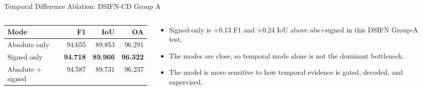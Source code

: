 \begin{frame}{Temporal Difference Ablation: DSIFN-CD Group A}
    \begin{columns}[T,onlytextwidth]
        \begin{column}{0.46\textwidth}
            \centering
            \scriptsize
            \begin{tabular}{lrrr}
                \toprule
                \textbf{Mode} & \textbf{F1} & \textbf{IoU} & \textbf{OA} \\
                \midrule
                Absolute only & 94.655 & 89.853 & 96.291 \\
                Signed only & \textbf{94.718} & \textbf{89.966} & \textbf{96.322} \\
                Absolute + signed & 94.587 & 89.731 & 96.237 \\
                \bottomrule
            \end{tabular}
        \end{column}
        \begin{column}{0.51\textwidth}
            \small
            \begin{itemize}
                \item Signed-only is \(+0.13\) F1 and \(+0.24\) IoU above abs+signed in this DSIFN Group-A test.
                \item The modes are close, so temporal mode alone is not the dominant bottleneck.
                \item The model is more sensitive to how temporal evidence is gated, decoded, and supervised.
            \end{itemize}
        \end{column}
    \end{columns}
\end{frame}
